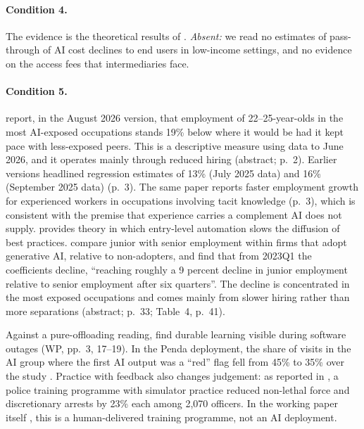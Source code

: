 \documentclass[12pt]{article}
\theoremstyle{remark}
\begin{document}
\paragraph{Condition 4.} The evidence is the theoretical results of \citet[pp.~99, 106, 110--111]{athey2026competition}. \emph{Absent:} we read no estimates of pass-through of AI cost declines to end users in low-income settings, and no evidence on the access fees that intermediaries face.

\paragraph{Condition 5.} \citet{brynjolfsson2025canaries} report, in the August 2026 version, that employment of 22--25-year-olds in the most AI-exposed occupations stands 19\% below where it would be had it kept pace with less-exposed peers. This is a descriptive measure using data to June 2026, and it operates mainly through reduced hiring (abstract; p.~2). Earlier versions headlined regression estimates of 13\% (July 2025 data) and 16\% (September 2025 data) (p.~3). The same paper reports faster employment growth for experienced workers in occupations involving tacit knowledge (p.~3), which is consistent with the premise that experience carries a complement AI does not supply. \citet[pp.~26--28]{ide2025automation} provides theory in which entry-level automation slows the diffusion of best practices. \citet[June 2026 version, p.~5; Fig.~5, p.~31]{hosseini2025seniority} compare junior with senior employment within firms that adopt generative AI, relative to non-adopters, and find that from 2023Q1 the coefficients decline, ``reaching roughly a 9 percent decline in junior employment relative to senior employment after six quarters''. The decline is concentrated in the most exposed occupations and comes mainly from slower hiring rather than more separations (abstract; p.~33; Table~4, p.~41).

Against a pure-offloading reading, \citet{brynjolfsson2025work} find durable learning visible during software outages (WP, pp.~3, 17--19). In the Penda deployment, the share of visits in the AI group where the first AI output was a ``red'' flag fell from 45\% to 35\% over the study \citep[p.~18]{korom2025penda}. Practice with feedback also changes judgement: as reported in \citet[p.~288]{ludwig2026reflective}, a police training programme with simulator practice reduced non-lethal force and discretionary arrests by 23\% each among 2,070 officers. In the working paper itself \citep[pp.~5, 31--32]{dube2025policing}, this is a human-delivered training programme, not an AI deployment.
\end{document}
